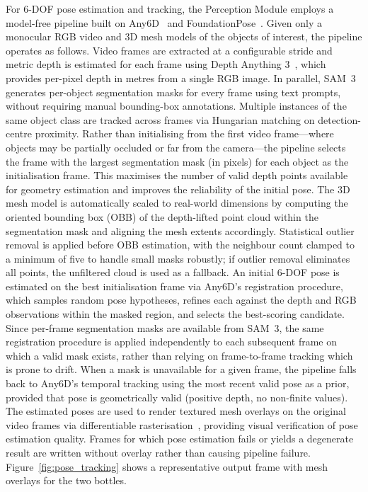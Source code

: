 \documentclass[11pt, a4paper]{article}
\begin{document}
For 6-DOF pose estimation and tracking, the Perception Module employs a model-free pipeline built on Any6D~\cite{any6d} and FoundationPose~\cite{foundationpose}. Given only a monocular RGB video and 3D mesh models of the objects of interest, the pipeline operates as follows.
Video frames are extracted at a configurable stride and metric depth is estimated for each frame using Depth Anything 3~\cite{depthanything3}, which provides per-pixel depth in metres from a single RGB image. In parallel, SAM~3~\cite{sam3, sam3dobjects} generates per-object segmentation masks for every frame using text prompts, without requiring manual bounding-box annotations. Multiple instances of the same object class are tracked across frames via Hungarian matching on detection-centre proximity.
Rather than initialising from the first video frame---where objects may be partially occluded or far from the camera---the pipeline selects the frame with the largest segmentation mask (in pixels) for each object as the initialisation frame. This maximises the number of valid depth points available for geometry estimation and improves the reliability of the initial pose.
 The 3D mesh model is automatically scaled to real-world dimensions by computing the oriented bounding box (OBB) of the depth-lifted point cloud within the segmentation mask and aligning the mesh extents accordingly. Statistical outlier removal is applied before OBB estimation, with the neighbour count clamped to a minimum of five to handle small masks robustly; if outlier removal eliminates all points, the unfiltered cloud is used as a fallback.
An initial 6-DOF pose is estimated on the best initialisation frame via Any6D's registration procedure, which samples random pose hypotheses, refines each against the depth and RGB observations within the masked region, and selects the best-scoring candidate. Since per-frame segmentation masks are available from SAM~3, the same registration procedure is applied independently to each subsequent frame on which a valid mask exists, rather than relying on frame-to-frame tracking which is prone to drift. When a mask is unavailable for a given frame, the pipeline falls back to Any6D's temporal tracking using the most recent valid pose as a prior, provided that pose is geometrically valid (positive depth, no non-finite values).
The estimated poses are used to render textured mesh overlays on the original video frames via differentiable rasterisation~\cite{nvdiffrast}, providing visual verification of pose estimation quality. Frames for which pose estimation fails or yields a degenerate result are written without overlay rather than causing pipeline failure. Figure~\ref{fig:pose_tracking} shows a representative output frame with mesh overlays for the two bottles.
\end{document}
